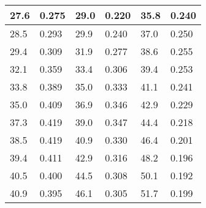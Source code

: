 \begin{table}[]
\begin{tabular}{|ll|ll|ll|}
    \multicolumn{1}{|l|}{27.6}              & 0.275                & \multicolumn{1}{l|}{29.0}              & 0.220               & \multicolumn{1}{l|}{35.8}              & 0.240               \\ \hline
    \multicolumn{1}{|l|}{28.5}              & 0.293                & \multicolumn{1}{l|}{29.9}              & 0.240               & \multicolumn{1}{l|}{37.0}              & 0.250               \\ \hline
    \multicolumn{1}{|l|}{29.4}              & 0.309                & \multicolumn{1}{l|}{31.9}              & 0.277               & \multicolumn{1}{l|}{38.6}              & 0.255               \\ \hline
    \multicolumn{1}{|l|}{32.1}              & 0.359                & \multicolumn{1}{l|}{33.4}              & 0.306               & \multicolumn{1}{l|}{39.4}              & 0.253               \\ \hline
    \multicolumn{1}{|l|}{33.8}              & 0.389                & \multicolumn{1}{l|}{35.0}              & 0.333               & \multicolumn{1}{l|}{41.1}              & 0.241               \\ \hline
    \multicolumn{1}{|l|}{35.0}              & 0.409                & \multicolumn{1}{l|}{36.9}              & 0.346               & \multicolumn{1}{l|}{42.9}              & 0.229               \\ \hline
    \multicolumn{1}{|l|}{37.3}              & 0.419                & \multicolumn{1}{l|}{39.0}              & 0.347               & \multicolumn{1}{l|}{44.4}              & 0.218               \\ \hline
    \multicolumn{1}{|l|}{38.5}              & 0.419                & \multicolumn{1}{l|}{40.9}              & 0.330               & \multicolumn{1}{l|}{46.4}              & 0.201               \\ \hline
    \multicolumn{1}{|l|}{39.4}              & 0.411                & \multicolumn{1}{l|}{42.9}              & 0.316               & \multicolumn{1}{l|}{48.2}              & 0.196               \\ \hline
    \multicolumn{1}{|l|}{40.5}              & 0.400                & \multicolumn{1}{l|}{44.5}              & 0.308               & \multicolumn{1}{l|}{50.1}              & 0.192               \\ \hline
    \multicolumn{1}{|l|}{40.9}              & 0.395                & \multicolumn{1}{l|}{46.1}              & 0.305               & \multicolumn{1}{l|}{51.7}              & 0.199               \\ \hline

\end{tabular}
\end{table}
